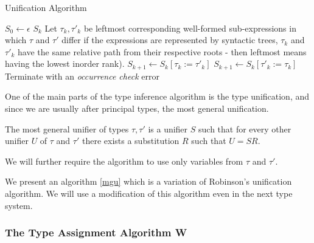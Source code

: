 \begin{algorithm}[t]
\caption{Unification Algorithm \cite{robinson1965machine}}
\label{mgu}
\begin{algorithmic}[1]
    \State $S_0 \gets \epsilon$
        \Return $S_k$
    \EndIf
    \State Let $\tau_k, \tau'_k$ be leftmost corresponding well-formed sub-expressions in which $\tau$ and $\tau'$ differ \Comment if the expressions are represented by syntactic trees, $\tau_k$ and $\tau'_k$ have the same relative path from their respective roots - then leftmost means having the lowest inorder rank).
        \State $S_{k+1} \gets S_k [\tau_k := \tau'_k]$
        \State $S_{k+1} \gets S_k [\tau'_k := \tau_k]$
    \Else
        \State Terminate with an \textit{occurrence check} error
    \EndIf
    \EndFor
\EndFunction
\end{algorithmic}
\end{algorithm}

One of the main parts of the type inference algorithm is the type unification, and since we are usually after principal types, the most general unification.

The most general unifier of types $\tau, \tau'$ is a unifier $S$ such that for every other unifier $U$ of $\tau$ and $\tau'$ there exists a substitution $R$ such that $U = S R$. \cite{damas1982principal}

We will further require the algorithm to use only variables from $\tau$ and $\tau'$.

We present an algorithm \ref{mgu} which is a variation of Robinson's unification algorithm. We will use a modification of this algorithm even in the next type system.

\subsubsection{The Type Assignment Algorithm W}

